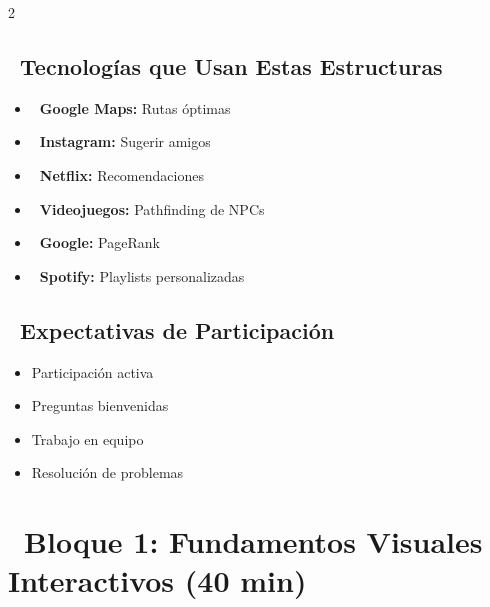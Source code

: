 \documentclass[12pt,a4paper]{article}
\begin{document}
	\begin{multicols}{2}
		\subsection*{\faLightbulb\ Tecnologías que Usan Estas Estructuras}
		
		\begin{itemize}[itemsep=0.3cm]
			\item \textbf{\faRoute\ Google Maps:} Rutas óptimas
			\item \textbf{\faInstagram\ Instagram:} Sugerir amigos  
			\item \textbf{\faFilm\ Netflix:} Recomendaciones
			\item \textbf{\faGamepad\ Videojuegos:} Pathfinding de NPCs
			\item \textbf{\faSearch\ Google:} PageRank
			\item \textbf{\faBrain\ Spotify:} Playlists personalizadas
		\end{itemize}
		
		\columnbreak
		
		\subsection*{\faUsers\ Expectativas de Participación}
		
		\begin{itemize}[itemsep=0.3cm]
			\item \textcolor{secondarygreen}{\faHandPaper} Participación activa
			\item \textcolor{primaryblue}{\faComments} Preguntas bienvenidas
			\item \textcolor{warningorange}{\faUsers} Trabajo en equipo
			\item \textcolor{turquoise}{\faPuzzlePiece} Resolución de problemas
		\end{itemize}
		
	\end{multicols}
	
	\newpage
	
	\section*{\faBook\ Bloque 1: Fundamentos Visuales Interactivos (40 min)}
	
	
\end{document}
